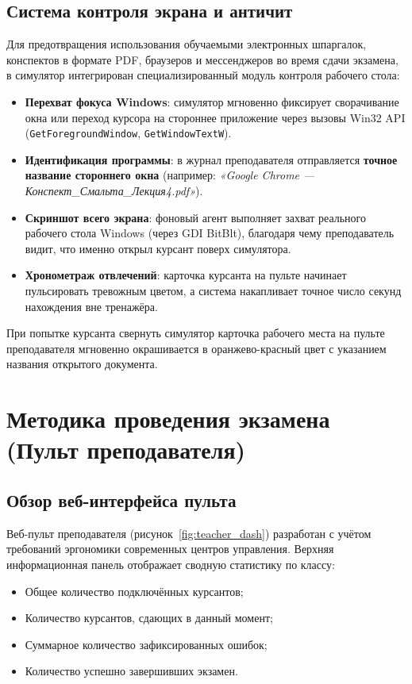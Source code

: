 \documentclass[12pt,a4paper]{report}
\begin{document}
\section{Система контроля экрана и античит}
Для предотвращения использования обучаемыми электронных шпаргалок, конспектов в формате PDF, браузеров и мессенджеров во время сдачи экзамена, в симулятор интегрирован специализированный модуль контроля рабочего стола:
\begin{itemize}
    \item \textbf{Перехват фокуса Windows}: симулятор мгновенно фиксирует сворачивание окна или переход курсора на стороннее приложение через вызовы Win32 API (\texttt{GetForegroundWindow}, \texttt{GetWindowTextW}).
    \item \textbf{Идентификация программы}: в журнал преподавателя отправляется \textbf{точное название стороннего окна} (например: \textit{«Google Chrome --- Конспект\_Смальта\_Лекция4.pdf»}).
    \item \textbf{Скриншот всего экрана}: фоновый агент выполняет захват реального рабочего стола Windows (через GDI BitBlt), благодаря чему преподаватель видит, что именно открыл курсант поверх симулятора.
    \item \textbf{Хронометраж отвлечений}: карточка курсанта на пульте начинает пульсировать тревожным цветом, а система накапливает точное число секунд нахождения вне тренажёра.
\end{itemize}

\begin{warnBox}
    При попытке курсанта свернуть симулятор карточка рабочего места на пульте преподавателя мгновенно окрашивается в оранжево-красный цвет с указанием названия открытого документа.
\end{warnBox}

\chapter{Методика проведения экзамена (Пульт преподавателя)}

\section{Обзор веб-интерфейса пульта}
Веб-пульт преподавателя (рисунок~\ref{fig:teacher_dash}) разработан с учётом требований эргономики современных центров управления. Верхняя информационная панель отображает сводную статистику по классу:
\begin{itemize}
    \item Общее количество подключённых курсантов;
    \item Количество курсантов, сдающих в данный момент;
    \item Суммарное количество зафиксированных ошибок;
    \item Количество успешно завершивших экзамен.
\end{itemize}
\end{document}
